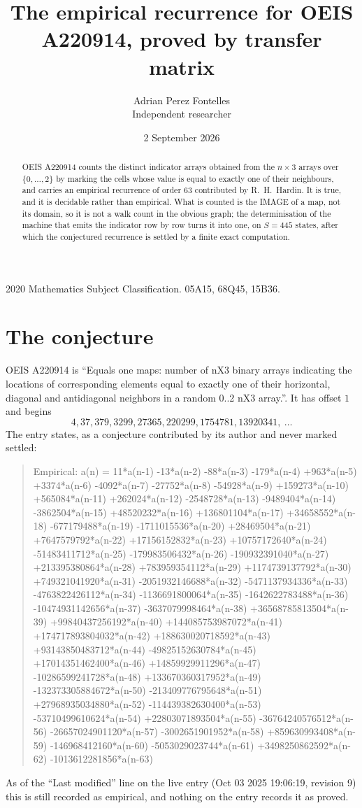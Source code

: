 \documentclass[11pt,a4paper]{article}
\title{The empirical recurrence for OEIS A220914, proved by transfer matrix}
\author{Adrian Perez Fontelles\\ \small Independent researcher}
\date{2 September 2026}
\theoremstyle{plain}
\theoremstyle{definition}
\begin{document}
\maketitle

\begin{abstract}
OEIS A220914 counts the distinct indicator arrays obtained from the $n\times3$ arrays over
$\{0,\dots,2\}$ by marking the cells whose value is equal to exactly one of their neighbours, and carries an
empirical recurrence of order $63$ contributed by R.~H.~Hardin. It is true, and it is
decidable rather than empirical. What is counted is the IMAGE of a map, not its domain, so it
is not a walk count in the obvious graph; the determinisation of the machine that emits the
indicator row by row turns it into one, on $S=445$ states, after which the conjectured
recurrence is settled by a finite exact computation.
\end{abstract}

\noindent\small 2020 Mathematics Subject Classification. 05A15, 68Q45, 15B36.\normalsize

\section{The conjecture}

OEIS A220914 is ``Equals one maps: number of nX3 binary arrays indicating the locations of corresponding elements equal to exactly one of their horizontal, diagonal and antidiagonal neighbors in a random 0..2 nX3 array.''. It has offset $1$ and begins
\[
4, 37, 379, 3299, 27365, 220299, 1754781, 13920341,\ \dots
\]
The entry states, as a conjecture contributed by its author and never marked settled:
\begin{quote}
Empirical: a(n) = 11*a(n-1) -13*a(n-2) -88*a(n-3) -179*a(n-4) +963*a(n-5) +3374*a(n-6) -4092*a(n-7) -27752*a(n-8) -54928*a(n-9) +159273*a(n-10) +565084*a(n-11) +262024*a(n-12) -2548728*a(n-13) -9489404*a(n-14) -3862504*a(n-15) +48520232*a(n-16) +136801104*a(n-17) +34658552*a(n-18) -677179488*a(n-19) -1711015536*a(n-20) +28469504*a(n-21) +7647579792*a(n-22) +17156152832*a(n-23) +10757172640*a(n-24) -51483411712*a(n-25) -179983506432*a(n-26) -190932391040*a(n-27) +213395380864*a(n-28) +783959354112*a(n-29) +1174739137792*a(n-30) +749321041920*a(n-31) -2051932146688*a(n-32) -5471137934336*a(n-33) -4763822426112*a(n-34) -1136691800064*a(n-35) -1642622783488*a(n-36) -10474931142656*a(n-37) -3637079998464*a(n-38) +36568785813504*a(n-39) +99840437256192*a(n-40) +144085753987072*a(n-41) +174717893804032*a(n-42) +188630020718592*a(n-43) +93143850483712*a(n-44) -49825152630784*a(n-45) +17014351462400*a(n-46) +14859929911296*a(n-47) -10286599241728*a(n-48) +133670360317952*a(n-49) -132373305884672*a(n-50) -213409776795648*a(n-51) +27968935034880*a(n-52) -114439382630400*a(n-53) -53710499610624*a(n-54) +22803071893504*a(n-55) -36764240576512*a(n-56) -26657024901120*a(n-57) -3002651901952*a(n-58) +859630993408*a(n-59) -146968412160*a(n-60) -5053029023744*a(n-61) +3498250862592*a(n-62) -1013612281856*a(n-63)
\end{quote}
As of the ``Last modified'' line on the live entry (Oct 03 2025 19:06:19, revision 9) this is still
recorded as empirical, and nothing on the entry records it as proved.
\end{document}
